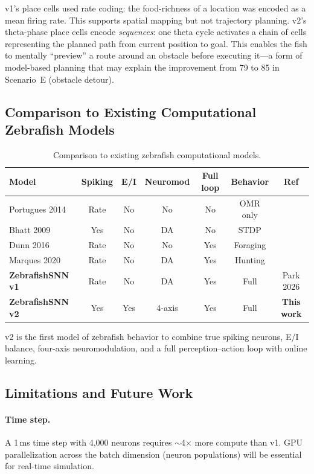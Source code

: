 \documentclass[11pt,a4paper]{article}
\begin{document}
v1's place cells used rate coding: the food-richness of a location was
encoded as a mean firing rate.
This supports spatial mapping but not trajectory planning.
v2's theta-phase place cells encode \emph{sequences}: one theta cycle
activates a chain of cells representing the planned path from current
position to goal.
This enables the fish to mentally ``preview'' a route around an obstacle
before executing it---a form of model-based planning that may explain
the improvement from 79 to 85 in Scenario~E (obstacle detour).

\subsection{Comparison to Existing Computational Zebrafish Models}

\begin{table}[H]
\centering
\caption{Comparison to existing zebrafish computational models.}
\label{tab:comparison}
\small
\begin{tabular}{lcccccc}
\toprule
Model & Spiking & E/I & Neuromod & Full loop & Behavior & Ref \\
\midrule
Portugues 2014 & Rate & No  & No  & No  & OMR only & \cite{portugues2014} \\
Bhatt 2009     & Yes  & No  & DA  & No  & STDP     & \cite{bhatt2009} \\
Dunn 2016      & Rate & No  & No  & Yes & Foraging & \cite{dunn2016} \\
Marques 2020   & Rate & No  & DA  & Yes & Hunting  & \cite{marques2020} \\
\textbf{ZebrafishSNN v1} & Rate & No  & DA  & Yes & Full     & Park 2026 \\
\textbf{ZebrafishSNN v2} & Yes  & Yes & 4-axis & Yes & Full & \textbf{This work} \\
\bottomrule
\end{tabular}
\end{table}

\noindent v2 is the first model of zebrafish behavior to combine true spiking neurons,
E/I balance, four-axis neuromodulation, and a full perception--action loop
with online learning.

\subsection{Limitations and Future Work}

\paragraph{Time step.}
A 1\,ms time step with 4,000 neurons requires $\sim$4$\times$ more compute
than v1. GPU parallelization across the batch dimension (neuron populations)
will be essential for real-time simulation.
\end{document}
